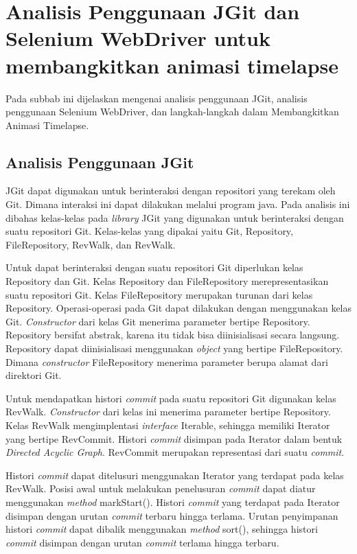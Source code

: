 \section{Analisis Penggunaan JGit dan Selenium WebDriver untuk membangkitkan animasi timelapse}
\label{sec:analisis_jgit_selenium}
Pada subbab ini dijelaskan mengenai analisis penggunaan JGit, analisis penggunaan Selenium WebDriver, dan langkah-langkah dalam Membangkitkan Animasi Timelapse. 

\subsection{Analisis Penggunaan JGit}
\label{subsec:analisis_jgit}
JGit dapat digunakan untuk berinteraksi dengan repositori yang terekam oleh Git. Dimana interaksi ini dapat dilakukan melalui program java. Pada analisis ini dibahas kelas-kelas pada \textit{library} JGit yang digunakan untuk berinteraksi dengan suatu repositori Git. Kelas-kelas yang dipakai yaitu Git, Repository, FileRepository, RevWalk, dan RevWalk.

Untuk dapat berinteraksi dengan suatu repositori Git diperlukan kelas Repository dan Git. Kelas Repository dan FileRepository merepresentasikan suatu repositori Git. Kelas FileRepository merupakan turunan dari kelas Repository. Operasi-operasi pada Git dapat dilakukan dengan menggunakan kelas Git. \textit{Constructor} dari kelas Git menerima parameter bertipe Repository. Repository bersifat abstrak, karena itu tidak bisa diinisialisasi secara langsung. Repository dapat diinisialisasi menggunakan \textit{object} yang bertipe FileRepository. Dimana \textit{constructor} FileRepository menerima parameter berupa alamat dari direktori Git.

Untuk mendapatkan histori \textit{commit} pada suatu repositori Git digunakan kelas RevWalk. \textit{Constructor} dari kelas ini menerima parameter bertipe Repository. Kelas RevWalk mengimplentasi \textit{interface} Iterable, sehingga memiliki Iterator yang bertipe RevCommit. Histori \textit{commit} disimpan pada Iterator dalam bentuk \textit{Directed Acyclic Graph}. RevCommit merupakan representasi dari suatu \textit{commit}. 

Histori \textit{commit} dapat ditelusuri menggunakan Iterator yang terdapat pada kelas RevWalk. Posisi awal untuk melakukan penelusuran \textit{commit} dapat diatur menggunakan \textit{method} markStart(). Histori \textit{commit} yang terdapat pada Iterator disimpan dengan urutan \textit{commit} terbaru hingga terlama. Urutan penyimpanan histori \textit{commit} dapat dibalik menggunakan \textit{method} sort(), sehingga histori \textit{commit} disimpan dengan urutan \textit{commit} terlama hingga terbaru.

